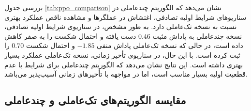بررسی جدول \ref{tab:ppo_comparison} نشان می‌دهد که الگوریتم چندعاملی  در سناریوهای شرایط اولیه تصادفی، اغتشاش در عملگرها و مشاهده ناقص عملکرد بهتری نسبت به نسخه تک‌عاملی دارد. به طور مشخص، در سناریوی شرایط اولیه تصادفی، نسخه چندعاملی به پاداش مثبت $0.46$ دست یافته و احتمال شکست را به صفر کاهش داده است، در حالی که نسخه تک‌عاملی پاداش منفی $-1.85$ و احتمال شکست $0.70$ را ثبت کرده است. با این حال، در سناریوی تأخیر زمانی، نسخه تک‌عاملی عملکرد بسیار بهتری داشته است. این نتایج نشان می‌دهد که الگوریتم  چندعاملی برای شرایط با عدم قطعیت اولیه بسیار مناسب است، اما در مواجهه با تأخیرهای زمانی آسیب‌پذیر می‌باشد.

\subsection{مقایسه الگوریتم‌های تک‌عاملی و چندعاملی }

